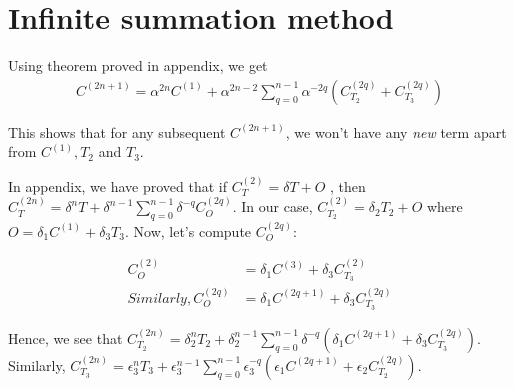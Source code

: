\documentclass[11pt,a4paper]{article}
\begin{document}
%
%
%
%
%
\section{Infinite summation method}

Using theorem proved in appendix, we get
\begin{align*}
C^{(2n+1)}= \alpha^{2n} C^{(1)} +\alpha^{2n-2} \sum_{q=0}^{n-1} \alpha^{-2q} (C^{(2q)}_{T_2} + C^{(2q)}_{T_3}  )
\end{align*}



This shows that for any subsequent $C^{(2n+1)}$, we won't have any \textit{new} term apart from $C^{(1)},T_2$ and $T_3$. 

In appendix, we have proved that if $C^{(2)}_T=  \delta T + O$ , then $C^{(2n)}_T= \delta^{n} T +  \delta^{n-1} \sum_{q=0}^{n-1} \delta^{-q} C^{(2q)}_O  $. In our case,  $C^{(2)}_{T_2}=  \delta_2 T_2 + O $ where $O=\delta_1 C^{(1)} + \delta_3 T_3$. Now, let's compute $C^{(2q)}_O$:

\begin{align*}
C^{(2)}_O&=\delta_1 C^{(3)} + \delta_3  C^{(2)}_{T_3} \\
Similarly, C^{(2q)}_O&=\delta_1 C^{(2q+1)} + \delta_3  C^{(2q)}_{T_3} 
\end{align*}

Hence, we see that $C^{(2n)}_{T_2}= \delta_2^{n} T_2 +  \delta_2^{n-1} \sum_{q=0}^{n-1} \delta^{-q} (\delta_1 C^{(2q+1)} + \delta_3  C^{(2q)}_{T_3})  $. Similarly, $C^{(2n)}_{T_3}= \epsilon_3^{n} T_3 +  \epsilon_3^{n-1} \sum_{q=0}^{n-1}\epsilon_3^{-q} (\epsilon_1 C^{(2q+1)} + \epsilon_2  C^{(2q)}_{T_2})  $. 
\end{document}
